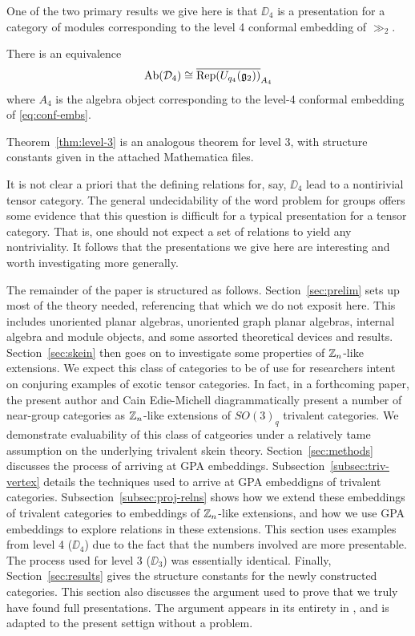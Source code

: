 One of the two primary results we give here is that $\DD_4$ is a presentation for a category of modules corresponding to the
level 4 conformal embedding of $\gg_2$.
\begin{theorem}
    There is an equivalence
    \[
        \operatorname{Ab}(\mathcal{D}_4) \cong \overline{\operatorname{Rep}(U_{q_4}(\mathfrak{g}_2))}_{A_4}
    \]
    where $A_4$ is the algebra object corresponding to the level-4 conformal embedding of \ref{eq:conf-embs}.
\end{theorem}
Theorem~\ref{thm:level-3} is an analogous theorem for level 3, with structure constants given in the attached Mathematica files.



It is not clear a priori that the defining relations for, say, $\DD_4$ lead to a nontirivial tensor category.
The general undecidability of the word problem for groups offers some evidence that this question is difficult
for a typical presentation for a tensor category.
That is, one should not expect a set of relations to yield any nontriviality.
It follows that the presentations we give here are interesting and worth investigating more generally.

The remainder of the paper is structured as follows.
Section~\ref{sec:prelim} sets up most of the theory needed, referencing that which we do not exposit here.
This includes unoriented planar algebras, unoriented graph planar algebras, 
internal algebra and module objects, and some assorted theoretical devices and results.
Section~\ref{sec:skein} then goes on to investigate some properties of $\mathbb{Z}_n$-like extensions.
We expect this class of categories to be of use for researchers intent on conjuring 
examples of exotic tensor categories.
In fact, in a forthcoming paper, the present author and Cain Edie-Michell diagrammatically
present a number of near-group categories as $\mathbb{Z}_n$-like extensions of $SO(3)_q$ trivalent categories.
We demonstrate evaluability of this class of catgeories under a relatively tame assumption on the
underlying trivalent skein theory.
Section~\ref{sec:methods} discusses the process of arriving at GPA embeddings.
Subsection~\ref{subsec:triv-vertex} details the techniques used to arrive at GPA embeddigns of 
trivalent categories. 
Subsection~\ref{subsec:proj-relns} shows how we extend these embeddings of trivalent categories
to embeddings of $\mathbb{Z}_n$-like extensions, and how we use GPA embeddings to explore 
relations in these extensions.
This section uses examples from level 4 ($\DD_4$) due to the fact that the numbers involved are more presentable.
The process used for level 3 ($\DD_3$) was essentially identical.
Finally, Section~\ref{sec:results} gives the structure constants for the newly constructed categories.
This section also discusses the argument used to prove that we truly have found full presentations.
The argument appears in its entirety in \cite{cain_noah}, and is adapted to the present settign without a problem.